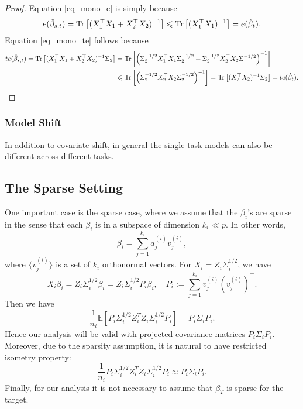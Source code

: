 \begin{proof}
	Equation \eqref{eq_mono_e} is simply because
		\[ e(\hat{\beta}_{s,t}) = \operatorname{Tr}\left[(X_1^{\top}X_1 + X_2^{\top}X_2)^{-1}\right] \leqslant \operatorname{Tr}\left[(X_1^{\top}X_1)^{-1}\right] = e(\hat{\beta}_t). \]
	Equation \eqref{eq_mono_te} follows because
	\begin{align*}
		te(\hat{\beta}_{s,t}) = \operatorname{Tr}\left[(X_1^{\top}X_1 + X_2^{\top}X_2)^{-1}\Sigma_2\right] &= \operatorname{Tr}\left[\left({\Sigma_2^{-1/2}X_1^{\top}X_1\Sigma_2^{-1/2} + \Sigma_2^{-1/2}X_2^{\top}X_2\Sigma^{-1/2}}\right)^{-1}\right] \\
		&\leqslant \operatorname{Tr}\left[\left({\Sigma_2^{-1/2}X_2^{\top}X_2\Sigma_2^{-1/2}}\right)^{-1}\right]
			= \operatorname{Tr}\left[(X_2^{\top}X_2)^{-1} \Sigma_2\right] = te(\hat{\beta}_t).
	\end{align*}
\end{proof}


\subsubsection{Model Shift}

In addition to covariate shift, in general the single-task models can also be different across different tasks.

\subsection{The Sparse Setting}
One important case is the sparse case, where we assume that the $\beta_i$'s are sparse in the sense 
that each $\beta_i$ is in a subspace of dimension $k_i\ll p$. In other words,
$$\beta_i = \sum_{j=1}^{k_i} a^{(i)}_j v^{(i)}_j,$$
where $\{v^{(i)}_j\}$ is a set of $k_i$ orthonormal vectors. For $X_i= Z_i \Sigma_i^{1/2}$, we have 
$$ X_i \beta_i = Z_i \Sigma_i^{1/2}\beta_i=  Z_i \Sigma_i^{1/2}P_i\beta_i,\quad P_i:= \sum_{j=1}^{k_i}v_j^{(i)}(v_j^{(i)})^\top.$$
Then we have 
$$\frac{1}{n_i}\mathbb E\left[P_i \Sigma_i^{1/2} Z_i^T Z_i \Sigma_i^{1/2}P_i\right]=P_i \Sigma_i P_i.$$
Hence our analysis will be valid with projected covariance matrices $P_i \Sigma_i P_i$. Moreover, due to the sparsity assumption, it is natural to have restricted isometry property: 
$$\frac{1}{n_i} P_i \Sigma_i^{1/2} Z_i^T Z_i \Sigma_i^{1/2}P_i \approx P_i \Sigma_i P_i.$$
Finally, for our analysis it is not necessary to assume that $\beta_T$ is sparse for the target. 


